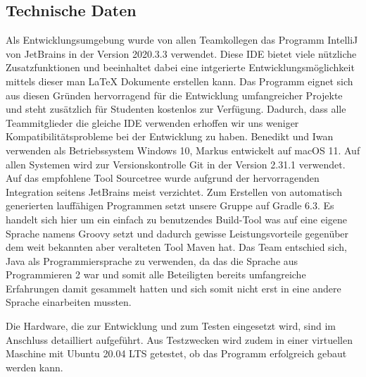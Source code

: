 \subsection{Technische Daten}\label{subsec:technische-daten}
Als Entwicklungsumgebung wurde von allen Teamkollegen das Programm IntelliJ von JetBrains in der Version 2020.3.3 verwendet.
Diese IDE bietet viele n\"utzliche Zusatzfunktionen und beeinhaltet dabei eine intgerierte Entwicklungsm\"oglichkeit mittels dieser man LaTeX Dokumente erstellen kann.
Das Programm eignet sich aus diesen Gr\"unden hervorragend f\"ur die Entwicklung umfangreicher Projekte und steht zus\"atzlich f\"ur Studenten kostenlos zur Verf\"ugung.
Dadurch, dass alle Teammitglieder die gleiche IDE verwenden erhoffen wir uns weniger Kompatibilit\"atsprobleme bei der Entwicklung zu haben.
Benedikt und Iwan verwenden als Betriebssystem Windows 10, Markus entwickelt auf macOS 11.
Auf allen Systemen wird zur Versionskontrolle Git in der Version 2.31.1 verwendet.
Auf das empfohlene Tool Sourcetree wurde aufgrund der hervorragenden Integration seitens JetBrains meist verzichtet.
Zum Erstellen von automatisch generierten lauff\"ahigen Programmen setzt unsere Gruppe auf Gradle 6.3.
Es handelt sich hier um ein einfach zu benutzendes Build-Tool was auf eine eigene Sprache namens Groovy setzt und dadurch gewisse Leistungsvorteile gegen\"uber dem weit bekannten aber veralteten Tool Maven hat.
Das Team entschied sich, Java als Programmiersprache zu verwenden, da das die Sprache aus Programmieren 2 war und somit alle Beteiligten bereits umfangreiche Erfahrungen damit gesammelt hatten und sich somit nicht erst in eine andere Sprache einarbeiten mussten.

Die Hardware, die zur Entwicklung und zum Testen eingesetzt wird, sind im Anschluss detailliert aufgef\"uhrt.
Aus Testzwecken wird zudem in einer virtuellen Maschine mit Ubuntu 20.04 LTS getestet, ob das Programm erfolgreich gebaut werden kann.

\newpage

